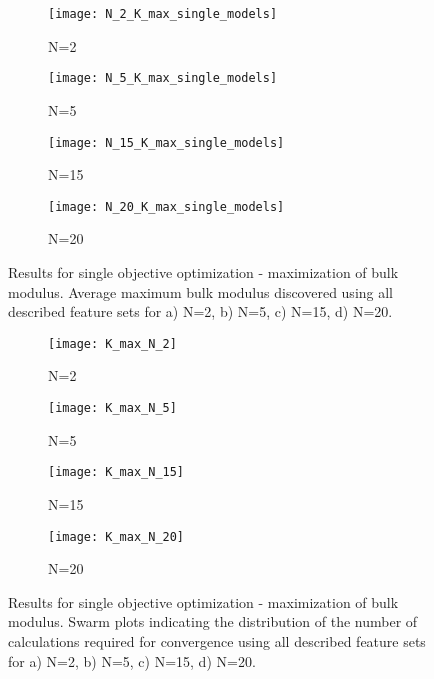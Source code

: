 \documentclass[preprint,amsmath,amssymb,aps, prb,showkeys]{revtex4-1}
\begin{document}
\begin{figure}[htp]
        \parbox{.975\textwidth}{
            \begin{subfigure}{.475\linewidth}
                \texttt{[image: N\_2\_K\_max\_single\_models]}
                \caption{N=2}
                \label{fig:Max_bulk_N_2_single_models}
        \end{subfigure}
        	\begin{subfigure}{.475\linewidth}
                \texttt{[image: N\_5\_K\_max\_single\_models]}
                \caption{N=5}
                \label{fig:Max_bulk_N_5_single_models}
        \end{subfigure}
        	\begin{subfigure}{.475\linewidth}
                \texttt{[image: N\_15\_K\_max\_single\_models]}
                \caption{N=15}
                \label{fig:Max_bulk_N_15_single_models}
        \end{subfigure}
        	\begin{subfigure}{.475\linewidth}
                \texttt{[image: N\_20\_K\_max\_single\_models]}
                \caption{N=20}
                \label{fig:Max_bulk_N_20_single_models}
        \end{subfigure}
        }
        \caption{ Results for single objective optimization - maximization of bulk modulus. Average maximum bulk modulus discovered using all described feature sets for a) N=2, b) N=5, c) N=15, d) N=20.}
        \label{fig:Max_bulk_modulus_single}        
\end{figure} 

\begin{figure}[htp]
        \parbox{.975\textwidth}{
            \begin{subfigure}{.475\linewidth}
                \texttt{[image: K\_max\_N\_2]}
                \caption{N=2}
                \label{fig:Max_bulk_N_2_swarm}
        \end{subfigure}
        	\begin{subfigure}{.475\linewidth}
                \texttt{[image: K\_max\_N\_5]}
                \caption{N=5}
                \label{fig:Max_bulk_N_5_swarm}
        \end{subfigure}
        	\begin{subfigure}{.475\linewidth}
                \texttt{[image: K\_max\_N\_15]}
                \caption{N=15}
                \label{fig:Max_bulk_N_15_swarm}
        \end{subfigure}
        	\begin{subfigure}{.475\linewidth}
                \texttt{[image: K\_max\_N\_20]}
                \caption{N=20}
                \label{fig:Max_bulk_N_20_swarm}
        \end{subfigure}
        }
        \caption{ Results for single objective optimization - maximization of bulk modulus. Swarm plots indicating the distribution of the number of calculations required for convergence using all described feature sets for a) N=2, b) N=5, c) N=15, d) N=20.}
        \label{fig:Max_bulk_modulus_swarm}        
\end{figure} 
\end{document}
